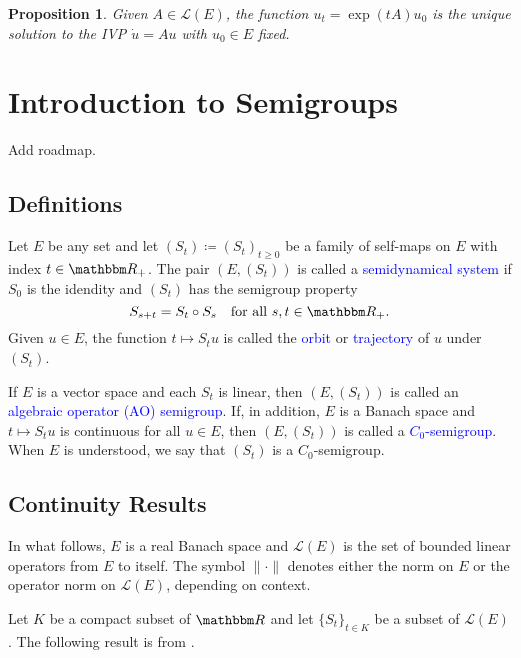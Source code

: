 \documentclass[12pt, reqno]{amsart}
\renewcommand{\geq}{\geqslant}
\newcommand{\1}{\mathbbm 1}
\newcommand{\lL}{\mathcal L}
\newcommand{\RR}{\mathbbm R}
\theoremstyle{plain}
\newtheorem{proposition}[theorem]{Proposition}
\theoremstyle{definition}
\newcommand{\navy}[1]{\textcolor{blue}{#1}}
\begin{document}
\begin{proposition}\label{p:}
    Given $A \in \lL(E)$, the function $u_t = \exp(tA) u_0$ is the 
    unique solution to the IVP $\dot u = A u$ with $u_0 \in E$ fixed. 
\end{proposition}




\section{Introduction to Semigroups}

Add roadmap.

\subsection{Definitions}

Let $E$ be any set and let $(S_t) \coloneq (S_t)_{t \geq 0}$ be a family of
self-maps on $E$ with index $t \in \RR_+$. The pair $(E, (S_t))$ is called a \navy{semidynamical system} if 
$S_0$ is the idendity and $(S_t)$ has the semigroup property
%
\begin{equation*}
    S_{s + t} = S_t \circ S_s
    \quad \text{for all } s, t \in \RR_+.
\end{equation*}
%
Given $u \in E$, the function $t \mapsto S_t u$ is called the \navy{orbit} or
\navy{trajectory} of $u$ under $(S_t)$.

If $E$ is a vector space and each $S_t$ is linear, then $(E, (S_t))$ is called
an \navy{algebraic operator (AO) semigroup}.  If, in addition, $E$ is a Banach
space and $t \mapsto S_t u$ is continuous for all $u \in E$, then $(E, (S_t))$
is called a \navy{$C_0$-semigroup}.  When $E$ is understood, we say that $(S_t)$
is a $C_0$-semigroup.



\subsection{Continuity Results}

In what follows, $E$ is a real Banach space and $\lL(E)$ is the set of bounded linear
operators from $E$ to itself.  The symbol $\| \cdot \|$ denotes either the norm
on $E$ or the operator norm on $\lL(E)$, depending on context.

Let $K$ be a compact subset of $\RR$ and let $\{S_t\}_{t \in K}$ be a subset of
$\lL(E)$.  The following result is from \cite{engel2006short}.
\end{document}
